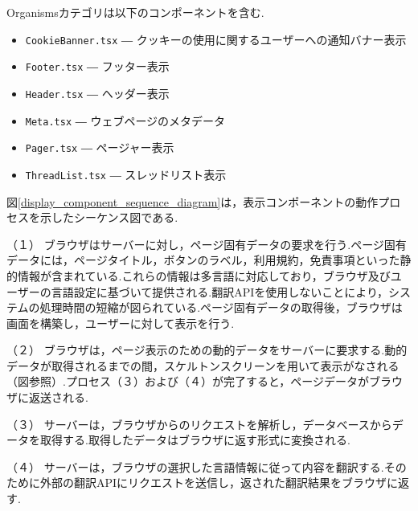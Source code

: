 \documentclass[b5paper,12pt,dvipdfmx]{jsreport}
\begin{document}
Organismsカテゴリは以下のコンポーネントを含む.

\begin{itemize}
    \item \texttt{CookieBanner.tsx} ― クッキーの使用に関するユーザーへの通知バナー表示
    \item \texttt{Footer.tsx} ― フッター表示
    \item \texttt{Header.tsx} ― ヘッダー表示
    \item \texttt{Meta.tsx} ― ウェブページのメタデータ
    \item \texttt{Pager.tsx} ― ページャー表示
    \item \texttt{ThreadList.tsx} ― スレッドリスト表示
\end{itemize}

図\ref{display_component_sequence_diagram}は，表示コンポーネントの動作プロセスを示したシーケンス図である.

（１）
ブラウザはサーバーに対し，ページ固有データの要求を行う.ページ固有データには，ページタイトル，ボタンのラベル，利用規約，免責事項といった静的情報が含まれている.これらの情報は多言語に対応しており，ブラウザ及びユーザーの言語設定に基づいて提供される.翻訳APIを使用しないことにより，システムの処理時間の短縮が図られている.ページ固有データの取得後，ブラウザは画面を構築し，ユーザーに対して表示を行う.

（２）
ブラウザは，ページ表示のための動的データをサーバーに要求する.動的データが取得されるまでの間，スケルトンスクリーンを用いて表示がなされる（図参照）.プロセス（３）および（４）が完了すると，ページデータがブラウザに返送される.

（３）
サーバーは，ブラウザからのリクエストを解析し，データベースからデータを取得する.取得したデータはブラウザに返す形式に変換される.

（４）
サーバーは，ブラウザの選択した言語情報に従って内容を翻訳する.そのために外部の翻訳APIにリクエストを送信し，返された翻訳結果をブラウザに返す.



\newpage
\end{document}
